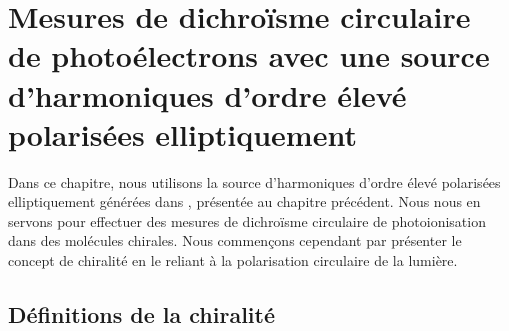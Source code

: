 \chapter[Mesures de PECD avec une source d'harmoniques d'ordre élevé polarisées elliptiquement]{Mesures de dichroïsme circulaire de photoélectrons avec une source d'harmoniques d'ordre élevé polarisées elliptiquement}
\label{CH:PECD}
Dans ce chapitre, nous utilisons la source d'harmoniques d'ordre élevé polarisées elliptiquement générées dans , présentée au chapitre précédent. Nous nous en servons pour effectuer des mesures de dichroïsme circulaire de photoionisation dans des molécules chirales. Nous commençons cependant par présenter le concept de chiralité en le reliant à la polarisation circulaire de la lumière. 
 
\section{Définitions de la chiralité}
